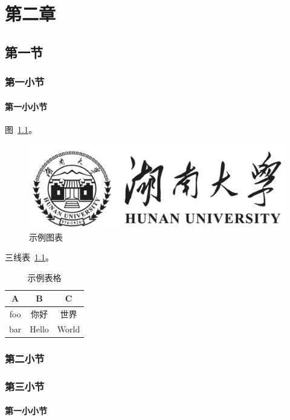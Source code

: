\chapter{第二章}

\section{第一节}

\subsection{第一小节}

\subsubsection{第一小小节}

图~\ref{fig:demo}。

\begin{figure}[H]
    \centering
    \includegraphics[width=0.3\linewidth]{figures/hnu_logo.png}
    \caption{示例图表}
    \label{fig:demo}
\end{figure}

三线表~\ref{table:demo}。

\begin{table}[H]
    \centering
    \caption{示例表格}
    \label{table:demo}
    \begin{tabular}{ccc}
        \toprule
        A   & B     & C     \\
        \midrule
        foo & 你好  & 世界  \\
        bar & Hello & World \\
        \bottomrule
    \end{tabular}
\end{table}


\subsection{第二小节}

\subsection{第三小节}

\subsubsection{第一小小节}

